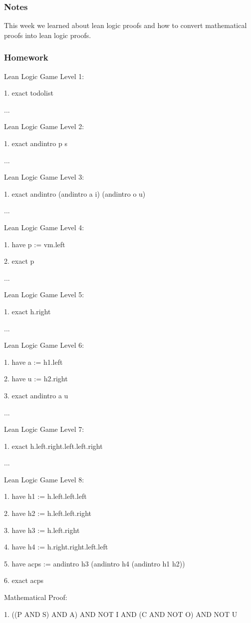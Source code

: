 \documentclass{article}
\theoremstyle{theorem}
\theoremstyle{definition}
\theoremstyle{remark}
\begin{document}
\subsubsection*{Notes}
This week we learned about lean logic proofs and how to convert mathematical proofs into lean logic proofs.

\subsubsection*{Homework}

Lean Logic Game Level 1:
 
1. exact todolist

...

Lean Logic Game Level 2:

1. exact andintro p s

...

Lean Logic Game Level 3:
 
1. exact andintro (andintro a i) (andintro o u)

...

Lean Logic Game Level 4:

1. have p := vm.left

2. exact p

...

Lean Logic Game Level 5:

1. exact h.right

...

Lean Logic Game Level 6:

1. have a := h1.left

2. have u := h2.right

3. exact andintro a u

...

Lean Logic Game Level 7:

1. exact h.left.right.left.left.right

...

Lean Logic Game Level 8:

1. have h1 := h.left.left.left

2. have h2 := h.left.left.right

3. have h3 := h.left.right

4. have h4 := h.right.right.left.left

5. have acps := andintro h3 (andintro h4 (andintro h1 h2))

6. exact acps

Mathematical Proof:

1. ((P AND S) AND A) AND NOT I AND (C AND NOT O) AND NOT U
\end{document}
